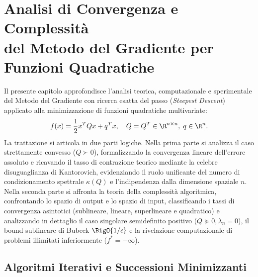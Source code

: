 \chapter[Analisi di Convergenza e Complessit\`a del Metodo del Gradiente]{Analisi di Convergenza e Complessit\`a\\del Metodo del Gradiente per Funzioni Quadratiche}
\label{chap:convergenza-complessita-gradiente-quadratiche}

Il presente capitolo approfondisce l'analisi teorica, computazionale e sperimentale del Metodo del Gradiente con ricerca esatta del passo (\textit{Steepest Descent}) applicato alla minimizzazione di funzioni quadratiche multivariate:
\begin{equation}
    f(x) = \frac{1}{2} x^T Q x + q^T x, \quad Q = Q^T \in \R^{n \times n}, \; q \in \R^n.
\end{equation}
La trattazione si articola in due parti logiche. Nella prima parte si analizza il caso strettamente convesso ($Q \succ 0$), formalizzando la convergenza lineare dell'errore assoluto e ricavando il tasso di contrazione teorico mediante la celebre disuguaglianza di Kantorovich, evidenziando il ruolo unificante del numero di condizionamento spettrale $\kappa(Q)$ e l'indipendenza dalla dimensione spaziale $n$. Nella seconda parte si affronta la teoria della complessit\`a algoritmica, confrontando lo spazio di output e lo spazio di input, classificando i tassi di convergenza asintotici (sublineare, lineare, superlineare e quadratico) e analizzando in dettaglio il caso singolare semidefinito positivo ($Q \succeq 0, \lambda_n = 0$), il bound sublineare di Bubeck $\BigO{1/\epsilon}$ e la rivelazione computazionale di problemi illimitati inferiormente ($f^* = -\infty$).

\FloatBarrier
\section{Algoritmi Iterativi e Successioni Minimizzanti}
\label{sec:algoritmi-iterativi-minimizzanti}

